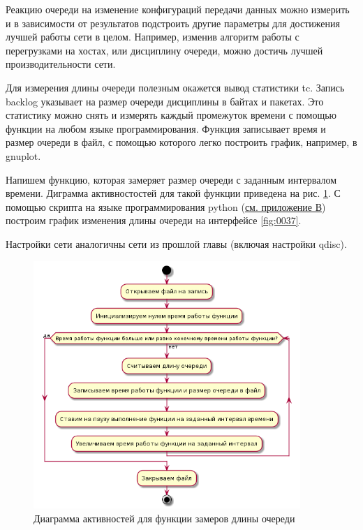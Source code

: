 \documentclass[
  13pt,
  fontsize=13pt,
  russian,
  a4paper,
,captions=tableheading
]{scrreprt}
\begin{document}
Реакцию очереди на изменение конфигураций передачи данных можно измерить
и в зависимости от результатов подстроить другие параметры для
достижения лучшей работы сети в целом. Например, изменив алгоритм работы
с перегрузками на хостах, или дисциплину очереди, можно достичь лучшей
производительности сети.

Для измерения длины очереди полезным окажется вывод статистики tc.
Запись backlog указывает на размер очереди дисциплины в байтах и
пакетах. Это статистику можно снять и измерять каждый промежуток времени
с помощью функции на любом языке программирования. Функция записывает
время и размер очереди в файл, с помощью которого легко построить
график, например, в gnuplot.

Напишем функцию, которая замеряет размер очереди с заданным интервалом
времени. Диграмма активностостей для такой функции приведена на рис.
\ref{fig:0036}. С помощью скрипта на языке программирования python
(\protect\hyperlink{appendix2}{см. приложение В}) построим график
изменения длины очереди на интерфейсе \ref{fig:0037}.

Настройки сети аналогичны сети из прошлой главы (включая настройки
qdisc).

\begin{figure}
\hypertarget{fig:0036}{%
\centering
\includegraphics[width=0.9\textwidth,height=\textheight]{iproute_act_dia.png}
\caption{Диаграмма активностей для функции замеров длины
очереди}\label{fig:0036}
}
\end{figure}
\end{document}
